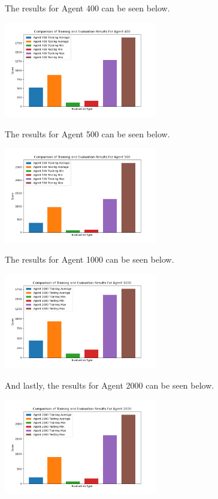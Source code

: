 \documentclass[
	a4paper, %
	10pt, %
	unnumberedsections, %
	twoside, %
]{LTJournalArticle}
\begin{document}
The results for Agent 400 can be seen below.

\begin{center}
	\includegraphics[width=0.5\textwidth]{Figures/Comparison/Agent 400.png}
\end{center}

The results for Agent 500 can be seen below.

\begin{center}
	\includegraphics[width=0.5\textwidth]{Figures/Comparison/Agent 500.png}
\end{center}

The results for Agent 1000 can be seen below.

\begin{center}
	\includegraphics[width=0.5\textwidth]{Figures/Comparison/Agent 1000.png}
\end{center}

And lastly, the results for Agent 2000 can be seen below.

\begin{center}
	\includegraphics[width=0.5\textwidth]{Figures/Comparison/Agent 2000.png}
\end{center}
\end{document}
